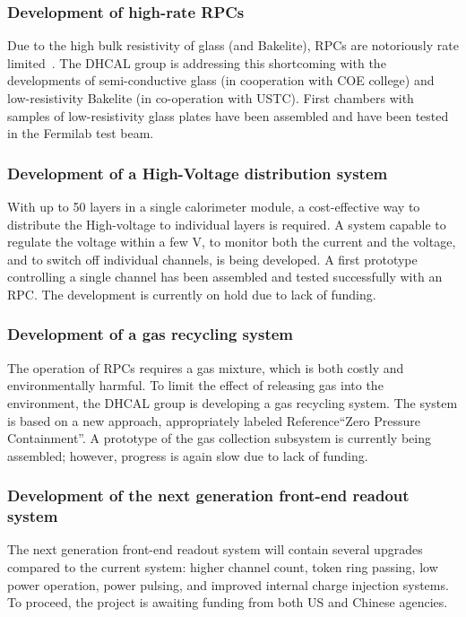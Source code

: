 \subsubsection{Development of high-rate RPCs}
Due to the high bulk resistivity of glass (and Bakelite), RPCs are notoriously rate limited~\cite{Bilki:2013:CAN42}. The DHCAL group is addressing this shortcoming with the developments of semi-conductive glass (in cooperation with COE college) and low-resistivity Bakelite (in co-operation with USTC). First chambers with samples of low-resistivity glass plates have been assembled and have been tested in the Fermilab test beam.
\subsubsection{Development of a High-Voltage distribution system}
With up to 50 layers in a single calorimeter module, a cost-effective way to distribute the High-voltage to individual layers is required. A system capable to regulate the voltage within a few \unit[100]{V}, to monitor both the current and the voltage, and to switch off individual channels, is being developed. A first prototype controlling a single channel has been assembled and tested successfully with an RPC. The development is currently on hold due to lack of funding.
\subsubsection{Development of a gas recycling system}
The operation of RPCs requires a gas mixture, which is both costly and environmentally harmful. To limit the effect of releasing gas into the environment, the DHCAL group is developing a gas recycling system. The system is based on a new approach, appropriately labeled {\color{red}Reference}``Zero Pressure Containment''. A prototype of the gas collection subsystem is currently being assembled; however, progress is again slow due to lack of funding.
\subsubsection{Development of the next generation front-end readout system}
The next generation front-end readout system will contain several upgrades compared to the current system: higher channel count, token ring passing, low power operation, power pulsing, and improved internal charge injection systems. To proceed, the project is awaiting funding from both US and Chinese agencies.

